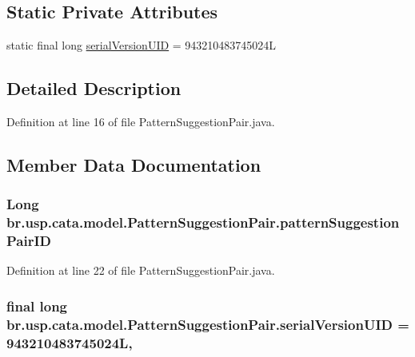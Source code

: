 \subsection*{Static Private Attributes}
\begin{DoxyCompactItemize}
\item 
static final long \hyperlink{classbr_1_1usp_1_1cata_1_1model_1_1_pattern_suggestion_pair_a217f8c997e3ff4c3b189761c6f711e4e}{serial\+Version\+U\+I\+D} = 943210483745024\+L
\end{DoxyCompactItemize}


\subsection{Detailed Description}


Definition at line 16 of file Pattern\+Suggestion\+Pair.\+java.



\subsection{Member Data Documentation}
\hypertarget{classbr_1_1usp_1_1cata_1_1model_1_1_pattern_suggestion_pair_a222c6b815086b1143ffde77952db85bf}{
\subsubsection[{pattern\+Suggestion\+Pair\+I\+D}]{\setlength{\rightskip}{0pt plus 5cm}Long br.\+usp.\+cata.\+model.\+Pattern\+Suggestion\+Pair.\+pattern\+Suggestion\+Pair\+I\+D\hspace{0.3cm}{\ttfamily [private]}}}\label{classbr_1_1usp_1_1cata_1_1model_1_1_pattern_suggestion_pair_a222c6b815086b1143ffde77952db85bf}


Definition at line 22 of file Pattern\+Suggestion\+Pair.\+java.

\hypertarget{classbr_1_1usp_1_1cata_1_1model_1_1_pattern_suggestion_pair_a217f8c997e3ff4c3b189761c6f711e4e}{
\subsubsection[{serial\+Version\+U\+I\+D}]{\setlength{\rightskip}{0pt plus 5cm}final long br.\+usp.\+cata.\+model.\+Pattern\+Suggestion\+Pair.\+serial\+Version\+U\+I\+D = 943210483745024\+L\hspace{0.3cm}{\ttfamily [static]}, {\ttfamily [private]}}}\label{classbr_1_1usp_1_1cata_1_1model_1_1_pattern_suggestion_pair_a217f8c997e3ff4c3b189761c6f711e4e}


